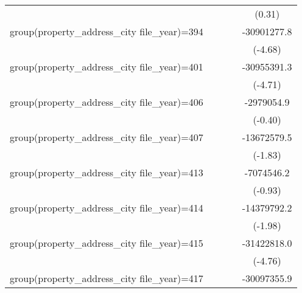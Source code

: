 {\begin{tabular}{l*{4}{c}}
                    &                     &                     &                     &      (0.31)         \\
\addlinespace
group(property\_address\_city file\_year)=394&                     &                     &                     & -30901277.8\sym{***}\\
                    &                     &                     &                     &     (-4.68)         \\
\addlinespace
group(property\_address\_city file\_year)=401&                     &                     &                     & -30955391.3\sym{***}\\
                    &                     &                     &                     &     (-4.71)         \\
\addlinespace
group(property\_address\_city file\_year)=406&                     &                     &                     &  -2979054.9         \\
                    &                     &                     &                     &     (-0.40)         \\
\addlinespace
group(property\_address\_city file\_year)=407&                     &                     &                     & -13672579.5         \\
                    &                     &                     &                     &     (-1.83)         \\
\addlinespace
group(property\_address\_city file\_year)=413&                     &                     &                     &  -7074546.2         \\
                    &                     &                     &                     &     (-0.93)         \\
\addlinespace
group(property\_address\_city file\_year)=414&                     &                     &                     & -14379792.2\sym{*}  \\
                    &                     &                     &                     &     (-1.98)         \\
\addlinespace
group(property\_address\_city file\_year)=415&                     &                     &                     & -31422818.0\sym{***}\\
                    &                     &                     &                     &     (-4.76)         \\
\addlinespace
group(property\_address\_city file\_year)=417&                     &                     &                     & -30097355.9\sym{***}\\

\end{tabular}}
